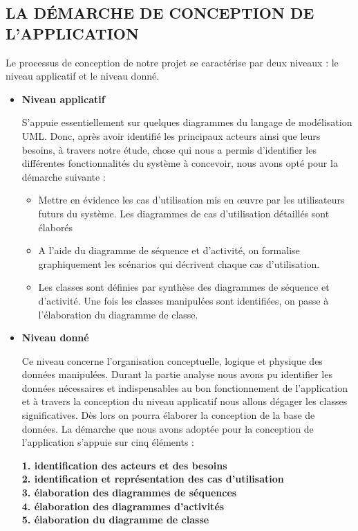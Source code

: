 \documentclass[english,12pt,a4paper]{report}
\begin{document}
\subsection{LA DÉMARCHE DE CONCEPTION DE L'APPLICATION}
Le processus de conception de notre projet se caractérise par deux niveaux : le niveau applicatif et le niveau donné.
\begin{itemize}
	\item \textbf{Niveau applicatif} \par
	S’appuie essentiellement sur quelques diagrammes du langage de modélisation UML. Donc, après avoir identifié les principaux acteurs ainsi que leurs besoins, à travers notre étude, chose qui nous a permis d’identifier les différentes fonctionnalités du système à concevoir, nous avons opté pour la démarche suivante :
	\begin{itemize}
		\item Mettre en évidence les cas d’utilisation mis en œuvre par les utilisateurs futurs du système. Les diagrammes de cas d’utilisation détaillés sont élaborés
		\item A l’aide du diagramme de séquence et d’activité, on formalise graphiquement les scénarios qui décrivent chaque cas d’utilisation.
		\item Les classes sont définies par synthèse des diagrammes de séquence et d’activité. Une fois les classes manipulées sont identifiées, on passe à l’élaboration du diagramme de classe.
	\end{itemize}
	\item \textbf{Niveau donné} \par
	Ce niveau concerne l’organisation conceptuelle, logique et physique des données manipulées. Durant la partie analyse nous avons pu identifier les données nécessaires et indispensables au bon fonctionnement de l’application et à travers la conception du niveau applicatif nous allons dégager les classes significatives. Dès lors on pourra élaborer la conception de la base de données.  La démarche que nous avons adoptée pour la conception de l’application s’appuie sur cinq éléments : \par
	\textbf{1. identification des acteurs et des besoins} \\
	\textbf{2. identification et représentation des cas d’utilisation}\\
	\textbf{3. élaboration des diagrammes de séquences} \\
	\textbf{4. élaboration des diagrammes d’activités}\\
	\textbf{5. élaboration du diagramme de classe} \par

\end{itemize}
\end{document}
